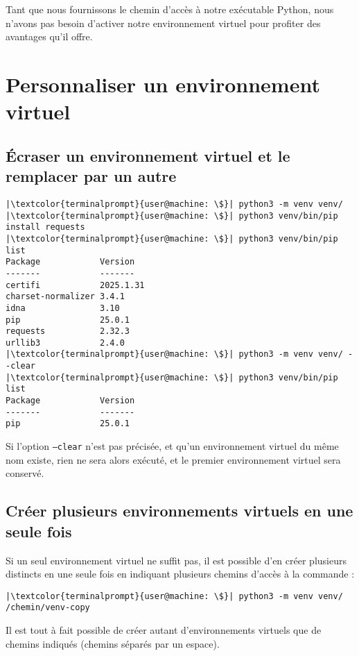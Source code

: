 Tant que nous fournissons le chemin d'accès à notre exécutable Python, nous n'avons pas besoin d'activer notre environnement virtuel pour profiter des avantages qu'il offre.

\section{Personnaliser un environnement virtuel}
\subsection*{Écraser un environnement virtuel et le remplacer par un autre}
\begin{lstlisting}[style=terminal]
|\textcolor{terminalprompt}{user@machine: \$}| python3 -m venv venv/
|\textcolor{terminalprompt}{user@machine: \$}| python3 venv/bin/pip install requests
|\textcolor{terminalprompt}{user@machine: \$}| python3 venv/bin/pip list
Package            Version
-------            -------
certifi            2025.1.31
charset-normalizer 3.4.1
idna               3.10
pip                25.0.1
requests           2.32.3
urllib3            2.4.0
|\textcolor{terminalprompt}{user@machine: \$}| python3 -m venv venv/ --clear
|\textcolor{terminalprompt}{user@machine: \$}| python3 venv/bin/pip list
Package            Version
-------            -------
pip                25.0.1
\end{lstlisting}

Si l'option \texttt{--clear} n'est pas précisée, et qu'un environnement virtuel du même nom existe, rien ne sera alors exécuté, et le premier environnement virtuel sera conservé.

\subsection*{Créer plusieurs environnements virtuels en une seule fois}
Si un seul environnement virtuel ne suffit pas, il est possible d'en créer plusieurs distincts en une seule fois en indiquant plusieurs chemins d'accès à la commande :
\begin{lstlisting}[style=terminal]
|\textcolor{terminalprompt}{user@machine: \$}| python3 -m venv venv/ /chemin/venv-copy
\end{lstlisting}

Il est tout à fait possible de créer autant d'environnements virtuels que de chemins indiqués (chemins séparés par un espace).

